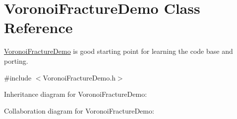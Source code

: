 \hypertarget{class_voronoi_fracture_demo}{\section{Voronoi\+Fracture\+Demo Class Reference}
\label{class_voronoi_fracture_demo}
}


\hyperlink{class_voronoi_fracture_demo}{Voronoi\+Fracture\+Demo} is good starting point for learning the code base and porting.  




{\ttfamily \#include $<$Voronoi\+Fracture\+Demo.\+h$>$}



Inheritance diagram for Voronoi\+Fracture\+Demo\+:


Collaboration diagram for Voronoi\+Fracture\+Demo\+:
